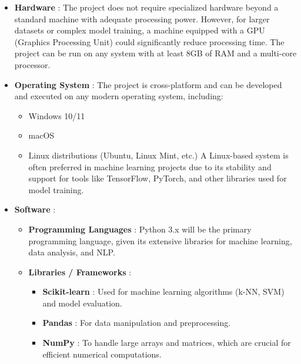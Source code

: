 \begin{itemize}
    
    \item \textbf{Hardware} : 
    \noindent
    The project does not require specialized hardware beyond a standard machine with adequate processing power. However, for larger datasets or complex model training, a machine equipped with a GPU (Graphics Processing Unit) could significantly reduce processing time. The project can be run on any system with at least 8GB of RAM and a multi-core processor.

    \item \textbf{Operating System} : 
    \noindent
    The project is cross-platform and can be developed and executed on any modern operating system, including:
        \begin{itemize}
            \item Windows 10/11
            \item macOS
            \item 
            \noindent
            Linux distributions (Ubuntu, Linux Mint, etc.) A Linux-based system is often preferred in machine learning projects due to its stability and support for tools like TensorFlow, PyTorch, and other libraries used for model training.
        \end{itemize}

    \item  \textbf{Software} :
    \noindent
        \begin{itemize}
            \item \textbf{Programming Languages} : 
            \noindent
            Python 3.x will be the primary programming language, given its extensive libraries for machine learning, data analysis, and NLP.

            \item \textbf{Libraries / Frameworks} :
            \noindent
                \begin{itemize}
                    
                    \item \textbf{Scikit-learn} :
                    \noindent
                    Used for machine learning algorithms (k-NN, SVM) and model evaluation.

                    \item \textbf{Pandas} :
                    \noindent
                    For data manipulation and preprocessing.

                    \item \textbf{NumPy} :
                    \noindent
                    To handle large arrays and matrices, which are crucial for efficient numerical computations.


\end{itemize}
\end{itemize}
\end{itemize}
